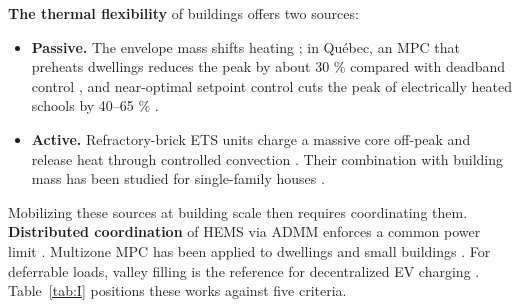 \documentclass[conference]{IEEEtran}
\providecommand{\tightlist}{\setlength{\itemsep}{0pt}\setlength{\parskip}{0pt}}
\begin{document}
\textbf{The thermal flexibility} of buildings offers two sources:

\begin{itemize}
\tightlist
\item
  \textbf{Passive.} The envelope mass shifts heating \cite{LeDreau2016}; in Québec, an MPC that preheats dwellings reduces the peak by about 30 \% compared with deadband control \cite{Vallianos2023}, and near-optimal setpoint control cuts the peak of electrically heated schools by 40--65 \% \cite{Morovat2022}.
\item
  \textbf{Active.} Refractory-brick ETS units charge a massive core off-peak and release heat through controlled convection \cite{Guzman2015, Devia2021}. Their combination with building mass has been studied for single-family houses \cite{EtedadiAliabadi2022}.
\end{itemize}

Mobilizing these sources at building scale then requires coordinating them. \textbf{Distributed coordination} of HEMS via ADMM enforces a common power limit \cite{Etedadi2023}. Multizone MPC has been applied to dwellings and small buildings \cite{Frahm2025, Hasrat2025}. For deferrable loads, valley filling is the reference for decentralized EV charging \cite{Gan2013}. Table~\ref{tab:I} positions these works against five criteria.
\end{document}
